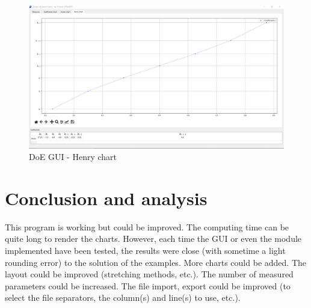\documentclass[english, 12 pt, openany, oneside]{book}
\begin{document}
\begin{figure}[!ht]
\centering
\includegraphics[width=\linewidth]{doe_gui_henry}
\caption{DoE GUI - Henry chart\label{fig:doe_gui_henry}}
\end{figure}

\chapter*{Conclusion and analysis}

This program is working but could be improved. The computing time can be quite long to render the charts. However, each time the GUI or even the module implemented have been tested, the results were close (with sometime a light rounding error) to the solution of the examples. More charts could be added. The layout could be improved (stretching methods, etc.). The number of measured parameters could be increased. The file import, export could be improved (to select the file separators, the column(s) and line(s) to use, etc.).

\printbibliography
\end{document}
